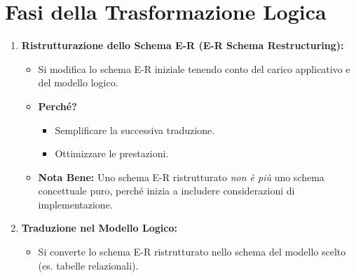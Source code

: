 \documentclass{article}
\begin{document}
	\section{Fasi della Trasformazione Logica}
	\begin{enumerate}
		\item \textbf{Ristrutturazione dello Schema E-R (E-R Schema Restructuring):}
		\begin{itemize}
			\item Si modifica lo schema E-R iniziale tenendo conto del carico applicativo e del modello logico.
			\item \textbf{Perché?}
			\begin{itemize}
				\item Semplificare la successiva traduzione.
				\item Ottimizzare le prestazioni.
			\end{itemize}
			\item \textbf{Nota Bene:} Uno schema E-R ristrutturato \textit{non è più} uno schema concettuale puro, perché inizia a includere considerazioni di implementazione.
		\end{itemize}
		\item \textbf{Traduzione nel Modello Logico:}
		\begin{itemize}
			\item Si converte lo schema E-R ristrutturato nello schema del modello scelto (es. tabelle relazionali).
		\end{itemize}
	\end{enumerate}
	
\end{document}
